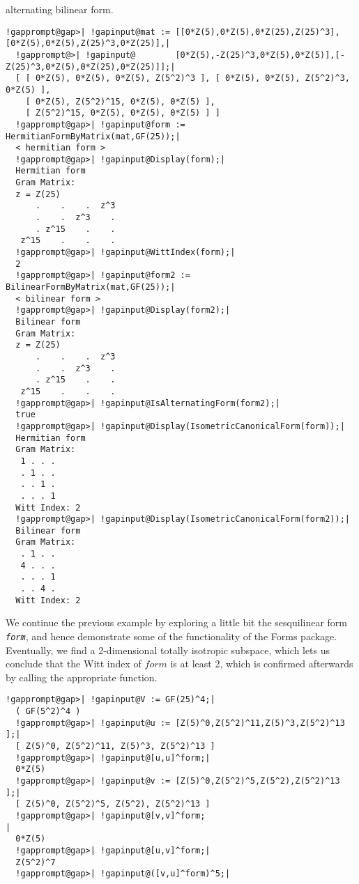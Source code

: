 \documentclass[a4paper,11pt]{report}
\begin{document}
{{{alternating bilinear form. 
\begin{Verbatim}[commandchars=!@|,fontsize=\small,frame=single,label=Example]
  !gapprompt@gap>| !gapinput@mat := [[0*Z(5),0*Z(5),0*Z(25),Z(25)^3],[0*Z(5),0*Z(5),Z(25)^3,0*Z(25)],|
  !gapprompt@>| !gapinput@        [0*Z(5),-Z(25)^3,0*Z(5),0*Z(5)],[-Z(25)^3,0*Z(5),0*Z(25),0*Z(25)]];|
  [ [ 0*Z(5), 0*Z(5), 0*Z(5), Z(5^2)^3 ], [ 0*Z(5), 0*Z(5), Z(5^2)^3, 0*Z(5) ], 
    [ 0*Z(5), Z(5^2)^15, 0*Z(5), 0*Z(5) ], 
    [ Z(5^2)^15, 0*Z(5), 0*Z(5), 0*Z(5) ] ]
  !gapprompt@gap>| !gapinput@form := HermitianFormByMatrix(mat,GF(25));|
  < hermitian form >
  !gapprompt@gap>| !gapinput@Display(form);|
  Hermitian form
  Gram Matrix:
  z = Z(25)
      .    .    .  z^3
      .    .  z^3    .
      . z^15    .    .
   z^15    .    .    .
  !gapprompt@gap>| !gapinput@WittIndex(form);|
  2
  !gapprompt@gap>| !gapinput@form2 := BilinearFormByMatrix(mat,GF(25));|
  < bilinear form >
  !gapprompt@gap>| !gapinput@Display(form2);|
  Bilinear form
  Gram Matrix:
  z = Z(25)
      .    .    .  z^3
      .    .  z^3    .
      . z^15    .    .
   z^15    .    .    .
  !gapprompt@gap>| !gapinput@IsAlternatingForm(form2);|
  true
  !gapprompt@gap>| !gapinput@Display(IsometricCanonicalForm(form));|
  Hermitian form
  Gram Matrix:
   1 . . .
   . 1 . .
   . . 1 .
   . . . 1
  Witt Index: 2
  !gapprompt@gap>| !gapinput@Display(IsometricCanonicalForm(form2));|
  Bilinear form
  Gram Matrix:
   . 1 . .
   4 . . .
   . . . 1
   . . 4 .
  Witt Index: 2
\end{Verbatim}
 We continue the previous example by exploring a little bit the sesquilinear
form \mbox{\texttt{\mdseries\slshape form}}, and hence demonstrate some of the functionality of the \textsf{Forms} package. Eventually, we find a 2-dimensional totally isotropic subspace, which
lets us conclude that the Witt index of $form$ is at least 2, which is confirmed afterwards by calling the appropriate
function. 
\begin{Verbatim}[commandchars=!@|,fontsize=\small,frame=single,label=Example]
  !gapprompt@gap>| !gapinput@V := GF(25)^4;|
  ( GF(5^2)^4 )
  !gapprompt@gap>| !gapinput@u := [Z(5)^0,Z(5^2)^11,Z(5)^3,Z(5^2)^13 ];|
  [ Z(5)^0, Z(5^2)^11, Z(5)^3, Z(5^2)^13 ]
  !gapprompt@gap>| !gapinput@[u,u]^form;|
  0*Z(5)
  !gapprompt@gap>| !gapinput@v := [Z(5)^0,Z(5^2)^5,Z(5^2),Z(5^2)^13 ];|
  [ Z(5)^0, Z(5^2)^5, Z(5^2), Z(5^2)^13 ]
  !gapprompt@gap>| !gapinput@[v,v]^form;                                     |
  0*Z(5)
  !gapprompt@gap>| !gapinput@[u,v]^form;|
  Z(5^2)^7
  !gapprompt@gap>| !gapinput@([v,u]^form)^5;|

\end{Verbatim}}}}
\end{document}
